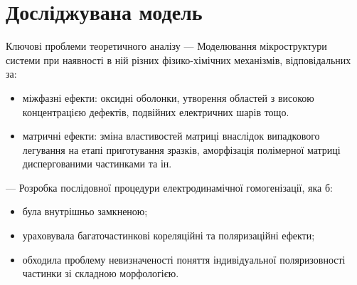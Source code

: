 \documentclass[10pt]{beamer}
\begin{document}
\section{Досліджувана модель}
\begin{frame}{Ключові проблеми теоретичного аналізу}
--- Моделювання мікроструктури системи при наявності в ній різних фізико-хімічних механізмів, відповідальних за:
\begin{itemize}\footnotesize
    \item міжфазні ефекти: оксидні оболонки, утворення областей з високою концентрацією дефектів, подвійних електричних шарів тощо.
    \item матричні ефекти: зміна властивостей матриці внаслідок випадкового легування на етапі приготування зразків, аморфізація полімерної матриці диспергованими частинками та ін.
\end{itemize}

--- Розробка послідовної процедури електродинамічної гомогенізації, яка б:
  
\begin{itemize}\footnotesize
    \item була внутрішньо замкненою;
    \item ураховувала  багаточастинкові кореляційні та поляризаційні ефекти;
    \item обходила проблему невизначеності поняття індивідуальної поляризовності частинки зі складною морфологією.
\end{itemize}

\end{frame}
\end{document}
